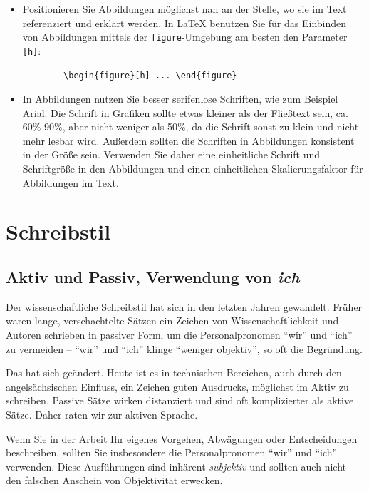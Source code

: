 \begin{itemize}
    \item Positionieren Sie Abbildungen möglichst nah an der Stelle, wo sie im Text referenziert und erklärt werden. In \LaTeX{} benutzen Sie für das Einbinden von Abbildungen mittels der \texttt{figure}-Umgebung am besten den Parameter \texttt{[h]}: 
    
    \begin{verbatim}
        \begin{figure}[h] ... \end{figure}
    \end{verbatim}
    
    \item In Abbildungen nutzen Sie besser serifenlose Schriften, wie zum Beispiel Arial. Die Schrift in Grafiken sollte etwas kleiner als der Fließtext sein, ca. 60\%-90\%, aber nicht weniger als 50\%, da die Schrift sonst zu klein und nicht mehr lesbar wird. Außerdem sollten die Schriften in Abbildungen konsistent in der Größe sein. Verwenden Sie daher eine einheitliche Schrift und Schriftgröße in den Abbildungen und einen einheitlichen Skalierungsfaktor für Abbildungen im Text.
\end{itemize}



\section{Schreibstil}

\subsection{Aktiv und Passiv, Verwendung von \textit{ich}}

Der wissenschaftliche Schreibstil hat sich in den letzten Jahren gewandelt. Früher waren lange, verschachtelte Sätzen ein Zeichen von Wissenschaftlichkeit und Autoren schrieben in passiver Form, um die Personalpronomen \enquote{wir} und \enquote{ich} zu vermeiden -- \enquote{wir} und \enquote{ich} klinge \enquote{weniger objektiv}, so oft die Begründung.

Das hat sich geändert. Heute ist es in technischen Bereichen, auch durch den angelsächsischen Einfluss, ein Zeichen guten Ausdrucks, möglichst im Aktiv zu schreiben. Passive Sätze wirken distanziert und sind oft komplizierter als aktive Sätze. Daher raten wir zur aktiven Sprache. 

Wenn Sie in der Arbeit Ihr eigenes Vorgehen, Abwägungen oder Entscheidungen beschreiben, sollten Sie insbesondere die Personalpronomen \enquote{wir} und \enquote{ich} verwenden. Diese Ausführungen sind inhärent \textit{subjektiv} und sollten auch nicht den falschen Anschein von Objektivität erwecken.

